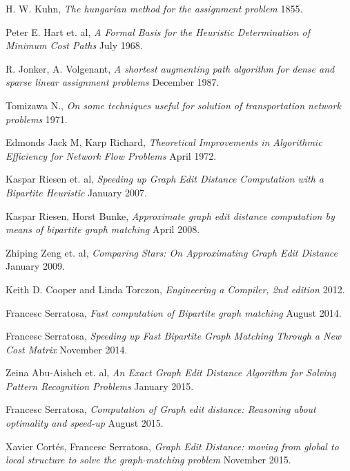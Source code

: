 \documentclass[
    12pt,                               %
    DIV=14,                     %
    parskip=half+,              %
    bigheadings,                %
    cleardoubleempty,   %
    halfparskip,                %
    ]{scrreprt} %
\begin{document}
\begin{thebibliography}{9}
	 H. W. Kuhn,
		\textit{The hungarian method for the assignment problem}
		1855.
		
	 Peter E. Hart et. al,
		\textit{A Formal Basis for the Heuristic Determination of Minimum Cost Paths}
		July 1968.
	
	 R. Jonker, A. Volgenant,
		\textit{A shortest augmenting path algorithm for dense and sparse linear assignment problems}
		December 1987.
		
	 Tomizawa N.,
		\textit{On some techniques useful for solution of transportation network problems}
		1971.
		
	 Edmonds Jack M, Karp Richard,
		\textit{Theoretical Improvements in Algorithmic Efficiency for Network Flow Problems}
		April 1972.
		
	 Kaspar Riesen et. al,
		\textit{Speeding up Graph Edit Distance Computation with a Bipartite Heuristic}
		January 2007.

	 Kaspar Riesen, Horst Bunke,
		\textit{Approximate graph edit distance computation by means of bipartite graph matching}
		April 2008.

	 Zhiping Zeng et. al,
		\textit{Comparing Stars: On Approximating Graph Edit Distance}
		January 2009.
		
	 Keith D. Cooper and Linda Torczon,
		\textit{Engineering a Compiler, 2nd edition}
		2012.

	 Francesc Serratosa,
		\textit{Fast computation of Bipartite graph matching}
		August 2014.
		
	 Francesc Serratosa,
		\textit{Speeding up Fast Bipartite Graph Matching Through a New Cost Matrix}
		November 2014.
		
	 Zeina Abu-Aisheh et. al,
		\textit{An Exact Graph Edit Distance Algorithm for Solving Pattern Recognition Problems}
		January 2015.
		
	 Francesc Serratosa,
		\textit{Computation of Graph edit distance: Reasoning about optimality and speed-up}
		August 2015.
		
	 Xavier Cortés, Francesc Serratosa,
		\textit{Graph Edit Distance: moving from global to local structure to solve the graph-matching problem}
		November 2015.
		

\end{thebibliography}
\end{document}
